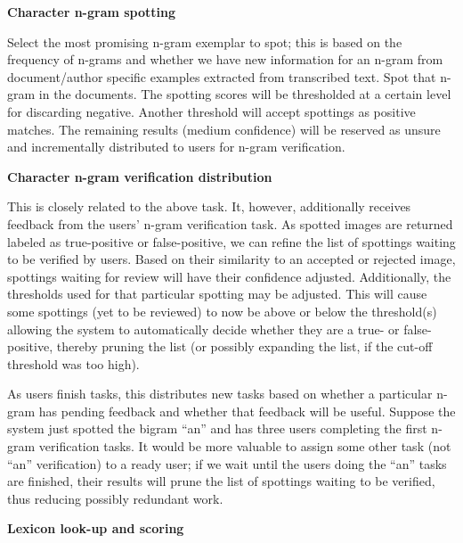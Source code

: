 \documentclass[ms]{byuprop}
\begin{document}
{\setlength{\parindent}{0cm}
\textbf{Character n-gram spotting}

\begin{addmargin}[3em]{3em}
Select the most promising n-gram exemplar to spot; this is based on the frequency of n-grams and whether we have new information for an n-gram from document/author specific examples extracted from transcribed text. Spot that n-gram in the documents. The spotting scores will be thresholded at a certain level for discarding negative. Another threshold will accept spottings as positive matches. The remaining results (medium confidence) will be reserved as unsure and incrementally distributed to users for n-gram verification.
\\[.5cm]
\end{addmargin}

\textbf{Character n-gram verification distribution}

\begin{addmargin}[3em]{3em}
This is closely related to the above task. It, however, additionally receives feedback from the users' n-gram verification task. As spotted images are returned labeled as true-positive or false-positive, we can refine the list of spottings waiting to be verified by users. Based on their similarity to an accepted or rejected image, spottings waiting for review will have their confidence adjusted. Additionally, the thresholds used for that particular spotting may be adjusted. This will cause some spottings (yet to be reviewed) to now be above or below the threshold(s) allowing the system to automatically decide whether they are a true- or false-positive, thereby pruning the list (or possibly expanding the list, if the cut-off threshold was too high).


\-\hspace{1cm} As users finish tasks, this distributes new tasks based on whether a particular n-gram has pending feedback and whether that feedback will be useful. Suppose the system just spotted the bigram ``an'' and has three users completing the first n-gram verification tasks. It would be more valuable to assign some other task (not ``an'' verification) to a ready user; if we wait until the users doing the ``an'' tasks are finished, their results will prune the list of spottings waiting to be verified, thus reducing possibly redundant work.
\\[.5cm]
\end{addmargin}

\textbf{Lexicon look-up and scoring}

}
\end{document}
